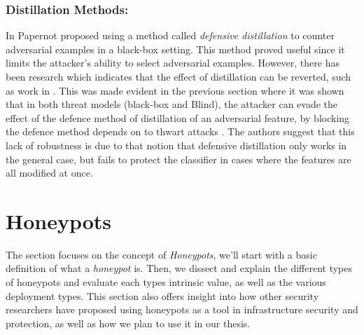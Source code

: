 \documentclass[grad,lot,lof,11pt,oneside,onehalfspace]{RUthesis}
\begin{document}
\subsubsection{Distillation Methods: } In \cite{papernot_distillation_2016} Papernot proposed using a method called \textit{defensive distillation} to counter adversarial examples in a black-box setting. This method proved useful since it limits the attacker's ability to select adversarial examples. However, there has been research which indicates that the effect of distillation can be reverted, such as work in \cite{carlini_defensive_nodate}. This was made evident in the previous section where it was shown that in both threat models (black-box and Blind), the attacker can evade the effect of the defence method of distillation of an adversarial feature, by blocking the defence method depends on to thwart attacks \cite{carlini_defensive_nodate}.  The authors suggest that this  lack of robustness is due to that notion that defensive distillation only works in the general case, but fails to protect the classifier in cases where the features are all modified at once.  
\newpage
\section{Honeypots}
The section focuses on the concept of \textit{Honeypots}, we'll start with a basic definition of what a \textit{honeypot} is. Then, we dissect and explain the different types of  honeypots and evaluate each types intrinsic value, as well as the various deployment types. This section also offers insight into how other security researchers have proposed using honeypots as a tool in infrastructure security and protection, as well as how we plan to use it in our thesis.  
\end{document}
